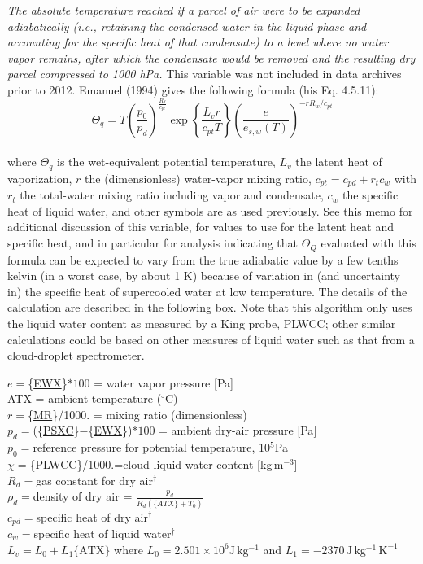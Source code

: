 \documentclass[
]{book}
\begin{document}
\emph{The absolute temperature reached if a parcel of air were to be expanded adiabatically (i.e., retaining the condensed water in the liquid phase and accounting for the specific heat of that condensate) to a level where no water vapor remains, after which the condensate would be removed and the resulting dry parcel compressed to 1000 hPa.} This variable was not included in data archives prior to 2012. Emanuel (1994) gives the following formula (his Eq. 4.5.11):\\
\begin{equation}
\Theta_{q}=T(\frac{p_{0}}{p_{d}})^{\frac{R_{d}}{c_{pt}}}\exp\left\{ \frac{L_{v}r}{c_{pt}T}\right\} \left(\frac{e}{e_{s,w}(T)}\right)^{-rR_{w}/c_{pt}}
\label{eq:THETAQ}
\end{equation}\\
where \(\Theta_q\) is the wet-equivalent potential temperature, \(L_v\) the latent heat of vaporization, \(r\) the (dimensionless) water-vapor mixing ratio, \(c_{pt} = c_{pd}+r_tc_w\) with \(r_t\) the total-water mixing ratio including vapor and condensate, \(c_w\) the specific heat of liquid water, and other symbols are as used previously. See this memo for additional discussion of this variable, for values to use for the latent heat and specific heat, and in particular for analysis indicating that \(\Theta_Q\) evaluated with this formula can be expected to vary from the true adiabatic value by a few tenths kelvin (in a worst case, by about 1 K) because of variation in (and uncertainty in) the specific heat of supercooled water at low temperature. The details of the calculation are described in the following box. Note that this algorithm only uses the liquid water content as measured by a King probe, PLWCC; other similar calculations could be based on other measures of liquid water such as that from a cloud-droplet spectrometer.

\(e=\)\{\protect\hyperlink{ewx}{EWX}\}\(*100\) = water vapor pressure {[}Pa{]}\\
\protect\hyperlink{ambient-t}{ATX} = ambient temperature (\(^{\circ}\mathrm{C}\))\\
\(r=\)\{\protect\hyperlink{MR}{MR}\}/1000. = mixing ratio (dimensionless)\\
\(p_{d}=\)(\{\protect\hyperlink{psx}{PSXC}\}\(-\)\{\protect\hyperlink{ewx}{EWX}\})\(*100\) = ambient dry-air pressure {[}Pa{]}\\
\(p_{0}=\)reference pressure for potential temperature, 10\(^{5}\)Pa\\
\(\chi=\)\{\href{./5-cloud-physics-variables.html\#plwcc}{PLWCC}\}/1000.=cloud liquid water content {[}kg\(\,\)m\(^{-3}\){]}\\
\(R_{d}=\)gas constant for dry air\(^{\dagger}\)\\
\(\rho_{d}=\)density of dry air = \(\frac{p_{d}}{R_{d}(\{ATX\}+T_{0})}\)\\
\(c_{pd}=\)specific heat of dry air\(^{\dagger}\)\\
\(c_{w}=\)specific heat of liquid water\(^{\dagger}\)\\
\(L_{v}=L_{0}+L_{1}\mathrm{\{ATX\}}\) where \(L_{0}=2.501\times10^{6}\mathrm{J}\,\mathrm{kg^{-1}}\)
and \(L_{1}=-2370\,\mathrm{J\,\mathrm{kg^{-1}\,\mathrm{K^{-1}}}}\)
\end{document}
